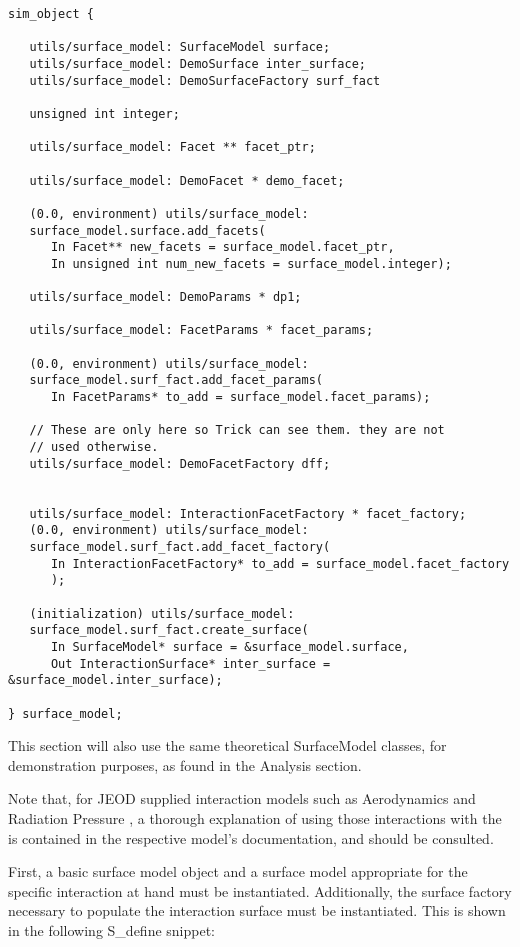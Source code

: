 \begin{verbatim}
sim_object {

   utils/surface_model: SurfaceModel surface;
   utils/surface_model: DemoSurface inter_surface;
   utils/surface_model: DemoSurfaceFactory surf_fact

   unsigned int integer;

   utils/surface_model: Facet ** facet_ptr;

   utils/surface_model: DemoFacet * demo_facet;

   (0.0, environment) utils/surface_model:
   surface_model.surface.add_facets(
      In Facet** new_facets = surface_model.facet_ptr,
      In unsigned int num_new_facets = surface_model.integer);

   utils/surface_model: DemoParams * dp1;

   utils/surface_model: FacetParams * facet_params;

   (0.0, environment) utils/surface_model:
   surface_model.surf_fact.add_facet_params(
      In FacetParams* to_add = surface_model.facet_params);

   // These are only here so Trick can see them. they are not
   // used otherwise.
   utils/surface_model: DemoFacetFactory dff;


   utils/surface_model: InteractionFacetFactory * facet_factory;
   (0.0, environment) utils/surface_model:
   surface_model.surf_fact.add_facet_factory(
      In InteractionFacetFactory* to_add = surface_model.facet_factory
      );

   (initialization) utils/surface_model:
   surface_model.surf_fact.create_surface(
      In SurfaceModel* surface = &surface_model.surface,
      Out InteractionSurface* inter_surface = &surface_model.inter_surface);

} surface_model;
\end{verbatim}

This section will also use the same theoretical SurfaceModel
classes, for demonstration purposes, as found in the
Analysis section.

Note that, for JEOD supplied interaction models such as Aerodynamics
\cite{dynenv:AERODYNAMICS} and Radiation Pressure
\cite{dynenv:RADIATIONPRESSURE}, a thorough explanation of using
those interactions with the \ModelDesc is contained
in the respective model's documentation, and should be consulted.

First, a basic surface model object and a surface model appropriate
for the specific interaction at hand must be instantiated. Additionally,
the surface factory necessary to populate the interaction surface must
be instantiated. This is shown in the following S\_define snippet:

